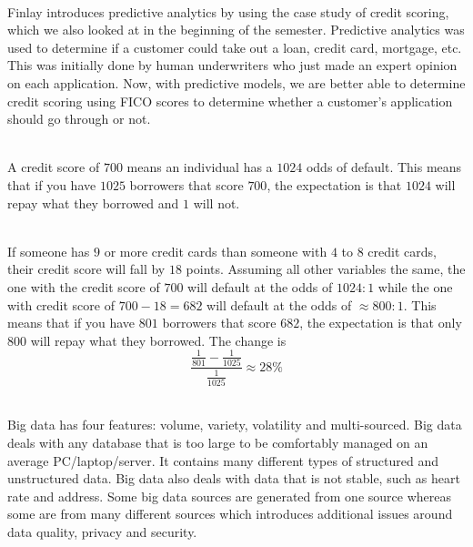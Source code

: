 \documentclass[12pt]{article}
\begin{document}

\begin{enumerate}

 \\
Finlay introduces predictive analytics by using the case study of credit scoring, which we also looked at in the beginning of the semester. Predictive analytics was used to determine if a customer could take out a loan, credit card, mortgage, etc. This was initially done by human underwriters who just made an expert opinion on each application. Now, with predictive models, we are better able to determine credit scoring using FICO scores to determine whether a customer's application should go through or not. 

 \\
A credit score of $700$ means an individual has a $1024$ odds of default. This means that if you have $1025$ borrowers that score $700$, the expectation is that $1024$ will repay what they borrowed and $1$ will not. 


 \\
If someone has $9$ or more credit cards than someone with $4$ to $8$ credit cards, their credit score will fall by $18$ points. Assuming all other variables the same, the one with the credit score of $700$ will default at the odds of $1024:1$ while the one with credit score of $700 - 18 = 682$ will default at the odds of $\approx 800:1$. This means that if you have $801$ borrowers that score $682$, the expectation is that only $800$ will repay what they borrowed. The change is $$ \frac{\frac{1}{801} - \frac{1}{1025}}{\frac{1}{1025}} \approx 28\% $$ 

\newpage
{} \\
Big data has four features: volume, variety, volatility and multi-sourced. Big data deals with any database that is too large to be comfortably managed on an average PC/laptop/server. It contains many different types of structured and unstructured data. Big data also deals with data that is not stable, such as heart rate and address. Some big data sources are generated from one source whereas some are from many different sources which introduces additional issues around data quality, privacy and security. 

\end{enumerate}
\end{document}
